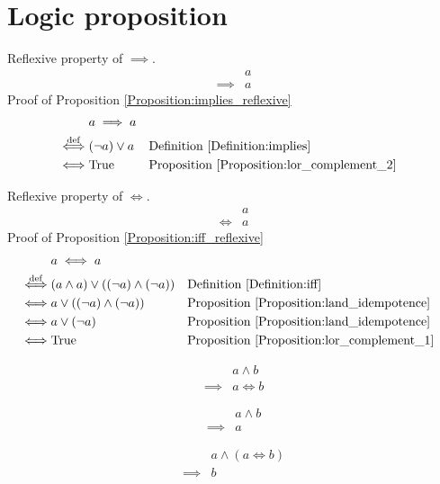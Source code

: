 \section{Logic proposition}
\begin{prop}
\label{Proposition:implies_reflexive}
Reflexive property of $\implies$.
\begin{align*}
& a \\
\implies & a
\end{align*}
Proof of Proposition \ref{Proposition:implies_reflexive}
\begin{align*}
& a \implies a \\
\overset{\operatorname{def}}{\iff} & (\lnot a) \lor a
& & \text{Definition \ref{Definition:implies}} \\
\iff & \text{True}
& & \text{Proposition \ref{Proposition:lor_complement_2}} \\
\end{align*}
\end{prop}

\begin{prop}
\label{Proposition:iff_reflexive}
Reflexive property of $\iff$.
\begin{align*}
& a \\
\iff & a
\end{align*}
Proof of Proposition \ref{Proposition:iff_reflexive}
\begin{align*}
& a \iff a \\
\overset{\operatorname{def}}{\iff} & (a \land a) \lor ((\lnot a) \land (\lnot a))
& & \text{Definition \ref{Definition:iff}} \\
\iff & a \lor ((\lnot a) \land (\lnot a))
& & \text{Proposition \ref{Proposition:land_idempotence}} \\
\iff & a \lor (\lnot a)
& & \text{Proposition \ref{Proposition:land_idempotence}} \\
\iff & \text{True}
& & \text{Proposition \ref{Proposition:lor_complement_1}} \\
\end{align*}
\end{prop}

\begin{prop}
\label{Proposition:land_implies_iff}
\begin{align*}
& a \land b \\
\implies & a \iff b
\end{align*}
\end{prop}

\begin{prop}
\label{Proposition:land_omit}
\begin{align*}
& a \land b \\
\implies & a
\end{align*}
\end{prop}

\begin{prop}
\label{Proposition:iff_satisfy}
\begin{align*}
& a \land (a \iff b) \\
\implies & b
\end{align*}
\end{prop}


